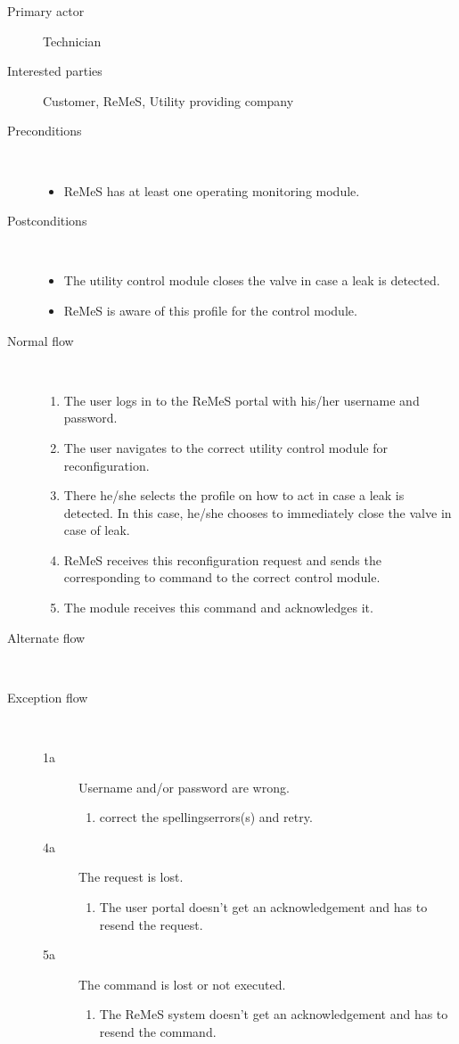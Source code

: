 \begin{description}
	\item[Primary actor] Technician
	\item[Interested parties] Customer, ReMeS, Utility providing company
	\item[Preconditions] \ 
	\begin{itemize}
		\item ReMeS has at least one operating monitoring module.
	\end{itemize}
	\item[Postconditions] \ 
	\begin{itemize}
		\item The utility control module closes the valve in case a leak is detected.
		\item ReMeS is aware of this profile for the control module.
	\end{itemize}
	\item[Normal flow] \ 
	\begin{enumerate}
	  	\item The user logs in to the ReMeS portal with his/her username and
	  	password.
	  	\item The user navigates to the correct utility control module for
	  	reconfiguration.
	  	\item There he/she selects the profile on how to act in case a leak is
	  	detected. In this case, he/she chooses to immediately close the valve in
	  	case of leak.
	  	\item ReMeS receives this reconfiguration request and sends the
	  	corresponding to command to the correct control module.
	  	\item The module receives this command and acknowledges it.
	\end{enumerate}
	\item[Alternate flow] \ 
	\begin{description}
		\item
	\end{description}
	\item[Exception flow] \ 
	\begin{description}
		\item[1a] Username and/or password are wrong.
		\begin{enumerate}
		  \item correct the spellingserrors(s) and retry.
		\end{enumerate}
		\item[4a] The request is lost.
		\begin{enumerate}
		  \item The user portal doesn't get an acknowledgement and has to resend the
		  request.
		\end{enumerate}
		\item[5a] The command is lost or not executed.
		\begin{enumerate}
		  \item The ReMeS system doesn't get an acknowledgement and has to resend the
		  command.
		 \end{enumerate}
	\end{description}
\end{description}